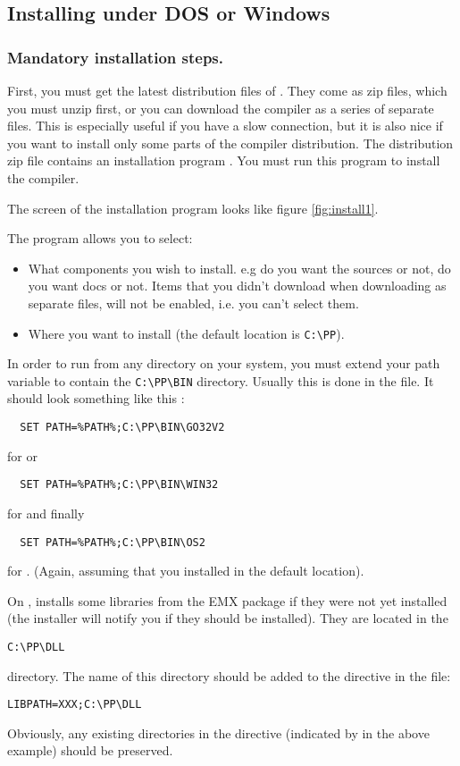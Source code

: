 \subsection{Installing under DOS or Windows}
\subsubsection{Mandatory installation steps.}
First, you must get the latest distribution files of \fpc. They come as zip
files, which you must unzip first, or you can download the compiler as a
series of separate files. This is especially useful if you have a slow
connection, but it is also nice if you want to install only some parts of the
compiler distribution.  The distribution zip file contains an
installation program . You must run this program to install
the compiler.

The screen of the installation program looks like figure \ref{fig:install1}.


The program allows you to select:
\begin{itemize}
\item What components you wish to install. e.g do you want the sources or
not, do you want docs or not. Items that you didn't download when
downloading as separate files, will not be enabled, i.e. you can't
select them.

\item Where you want to install (the default location is \verb|C:\PP|).
\end{itemize}

In order to run \fpc from any directory on your system, you must extend
your path variable to contain the \verb|C:\PP\BIN| directory.
Usually this is done in the  file.
It should look something like this :
\begin{verbatim}
  SET PATH=%PATH%;C:\PP\BIN\GO32V2
\end{verbatim}
for \dos or 
\begin{verbatim}
  SET PATH=%PATH%;C:\PP\BIN\WIN32
\end{verbatim}
for \windows and finally
\begin{verbatim}
  SET PATH=%PATH%;C:\PP\BIN\OS2
\end{verbatim}
for \ostwo.
(Again, assuming that you installed in the default location).

On \ostwo, \fpc installs some libraries from the EMX package if they
were not yet installed (the installer will notify you if they should be
installed). They are located in the 
\begin{verbatim}
C:\PP\DLL
\end{verbatim}
directory. The name of this directory should be added to the 
directive in the  file:
\begin{verbatim}
LIBPATH=XXX;C:\PP\DLL
\end{verbatim}
Obviously, any existing directories in the  directive
(indicated by  in the above example) should be preserved.

